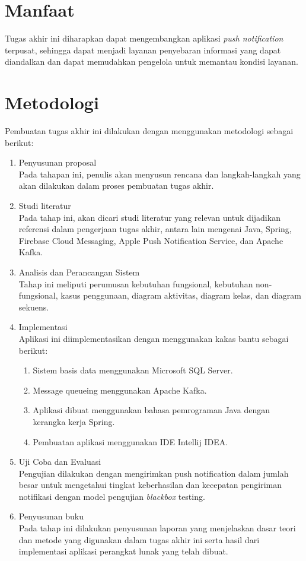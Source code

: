 \section{Manfaat}
Tugas akhir ini diharapkan dapat mengembangkan aplikasi \textit{push notification} terpusat, sehingga dapat menjadi layanan penyebaran informasi yang dapat diandalkan dan dapat memudahkan pengelola untuk memantau kondisi layanan.

\section {Metodologi}
Pembuatan tugas akhir ini dilakukan dengan menggunakan metodologi sebagai berikut:
\begin{enumerate}
\item Penyusunan proposal\\
Pada tahapan ini, penulis akan menyusun rencana dan langkah-langkah yang akan dilakukan dalam proses pembuatan tugas akhir.
\item Studi literatur\\
Pada tahap ini, akan dicari studi literatur yang relevan untuk dijadikan referensi dalam pengerjaan tugas akhir, antara lain mengenai Java, Spring, Firebase Cloud Messaging, Apple Push Notification Service, dan Apache Kafka.
\item Analisis dan Perancangan Sistem\\
Tahap ini meliputi perumusan kebutuhan fungsional, kebutuhan non-fungsional, kasus penggunaan, diagram aktivitas, diagram kelas, dan diagram sekuens.
\item Implementasi\\
Aplikasi ini diimplementasikan dengan menggunakan kakas bantu sebagai berikut:
\begin{enumerate}
\item Sistem basis data menggunakan Microsoft SQL Server.
\item Message queueing menggunakan Apache Kafka.
\item Aplikasi dibuat menggunakan bahasa pemrograman Java dengan kerangka kerja Spring.
\item Pembuatan aplikasi menggunakan IDE Intellij IDEA.
\end{enumerate}
\item Uji Coba dan Evaluasi\\
Pengujian dilakukan dengan mengirimkan push notification dalam jumlah besar untuk mengetahui tingkat keberhasilan dan kecepatan pengiriman notifikasi dengan model pengujian \textit{blackbox} testing.
\item Penyusunan buku\\
Pada tahap ini dilakukan penyusunan laporan yang menjelaskan dasar teori dan metode yang digunakan dalam tugas akhir ini serta hasil dari implementasi aplikasi perangkat lunak yang telah dibuat.
\end{enumerate}

